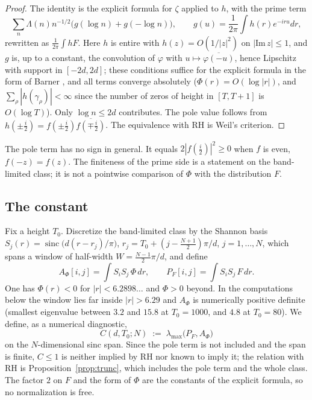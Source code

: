 \documentclass[11pt]{amsart}
\theoremstyle{definition}
\theoremstyle{remark}
\newcommand{\Cband}{C}
\newcommand{\Aphi}{A_\Phi}
\newcommand{\Pf}{P_F}
\begin{document}
\begin{proof}
The identity is the explicit formula for $\zeta$ \cite{Weil1952} applied to $h$, with the prime term
\[\textstyle\sum_n\Lambda(n)n^{-1/2}\big(g(\log n)+g(-\log n)\big),\qquad g(u)=\frac1{2\pi}\int h(r)e^{-iru}dr,\]
rewritten as $\frac1{2\pi}\int h F$. Here $h$ is entire with $h(z)=O(1/|z|^2)$ on $|\mathrm{Im}\,z|\le1$, and
$g$ is, up to a constant, the convolution of $\varphi$ with $u\mapsto\overline{\varphi(-u)}$, hence Lipschitz with
support in $[-2d,2d]$; these conditions suffice for the explicit formula in the form of Barner \cite{Barner}, and all terms converge absolutely
($\Phi(r)=O(\log|r|)$, and $\sum_\rho|h(\gamma_\rho)|<\infty$ since the number of zeros of height in $[T,T+1]$ is
$O(\log T)$). Only $\log n\le 2d$ contributes. The pole value follows from $h(\pm\frac i2)=f(\pm\frac
i2)\overline{f(\mp\frac i2)}$. The equivalence with RH is Weil's criterion.
\end{proof}

The pole term has no sign in general. It equals $2|f(\frac i2)|^2\ge0$ when $f$ is even, $f(-z)=f(z)$. The finiteness of the prime side is a statement on
the band-limited class; it is not a pointwise comparison of $\Phi$ with the distribution $F$.

\subsection{The constant}
Fix a height $T_0$. Discretize the band-limited class by the Shannon basis
$S_j(r)=\operatorname{sinc}\!\big(d(r-r_j)/\pi\big)$, $r_j=T_0+(j-\tfrac{N+1}2)\pi/d$, $j=1,\dots,N$, which spans
a window of half-width $W=\tfrac{N-1}{2}\pi/d$, and define
\begin{equation}\label{eq:grams}
\Aphi[i,j]=\int S_i S_j\,\Phi\,dr,\qquad \Pf[i,j]=\int S_i S_j\,F\,dr.
\end{equation}
One has $\Phi(r)<0$ for $|r|<6.2898\ldots$ and $\Phi>0$ beyond. In the computations below the window lies far
inside $|r|>6.29$ and $\Aphi$ is numerically positive definite (smallest eigenvalue between $3.2$ and $15.8$ at
$T_0=1000$, and $4.8$ at $T_0=80$). We define, as a numerical diagnostic,
\begin{equation}\label{eq:Cdef}
\boxed{\ \Cband(d,T_0;N)\;:=\;\lambda_{\max}\!\big(\Pf,\Aphi\big)\ }
\end{equation}
on the $N$-dimensional sinc span. Since the pole term is not included and the span is finite, $\Cband\le1$ is
neither implied by RH nor known to imply it; the relation with RH is Proposition~\ref{prop:trunc}, which
includes the pole term and the whole class. The factor $2$ on $F$ and the form of $\Phi$ are the constants of
the explicit formula, so no normalization is free.
\end{document}

